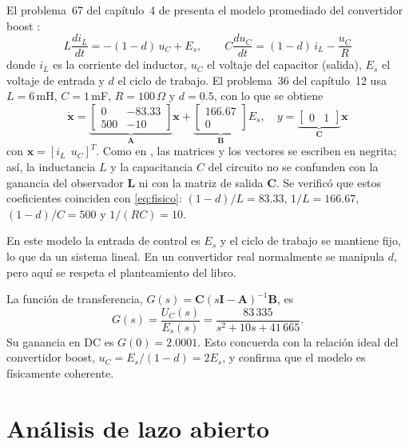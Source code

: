 \documentclass[conference,a4paper]{IEEEtran}
\begin{document}
El problema~67 del capítulo~4 de \cite{nise} presenta el modelo promediado del convertidor boost \cite{vandijk}:
\begin{equation}
L\frac{di_L}{dt} = -(1-d)\,u_C + E_s, \qquad
C\frac{du_C}{dt} = (1-d)\,i_L - \frac{u_C}{R}
\label{eq:fisico}
\end{equation}
donde $i_L$ es la corriente del inductor, $u_C$ el voltaje del capacitor (salida), $E_s$ el voltaje de entrada y $d$ el ciclo de trabajo. El problema~36 del capítulo~12 usa $L = 6$\,mH, $C = 1$\,mF, $R = 100\,\Omega$ y $d = 0.5$, con lo que se obtiene
\begin{equation}
\dot{\mathbf{x}} = \underbrace{\begin{bmatrix}0 & -83.33\\ 500 & -10\end{bmatrix}}_{\mathbf{A}} \mathbf{x}
+ \underbrace{\begin{bmatrix}166.67\\ 0\end{bmatrix}}_{\mathbf{B}} E_s, \quad
y = \underbrace{\begin{bmatrix}0 & 1\end{bmatrix}}_{\mathbf{C}} \mathbf{x}
\label{eq:ss}
\end{equation}
con $\mathbf{x} = [i_L\ \ u_C]^T$. Como en \cite{nise}, las matrices y los vectores se escriben en negrita; así, la inductancia $L$ y la capacitancia $C$ del circuito no se confunden con la ganancia del observador $\mathbf{L}$ ni con la matriz de salida $\mathbf{C}$. Se verificó que estos coeficientes coinciden con \eqref{eq:fisico}: $(1-d)/L = 83.33$, $1/L = 166.67$, $(1-d)/C = 500$ y $1/(RC) = 10$.

En este modelo la entrada de control es $E_s$ y el ciclo de trabajo se mantiene fijo, lo que da un sistema lineal. En un convertidor real normalmente se manipula $d$, pero aquí se respeta el planteamiento del libro.

La función de transferencia, $G(s) = \mathbf{C}(s\mathbf{I} - \mathbf{A})^{-1}\mathbf{B}$, es
\begin{equation}
G(s) = \frac{U_C(s)}{E_s(s)} = \frac{83\,335}{s^2 + 10s + 41\,665}.
\label{eq:tf}
\end{equation}
Su ganancia en DC es $G(0) = 2.0001$. Esto concuerda con la relación ideal del convertidor boost, $u_C = E_s/(1-d) = 2E_s$, y confirma que el modelo es físicamente coherente.

\section{Análisis de lazo abierto}
\end{document}
